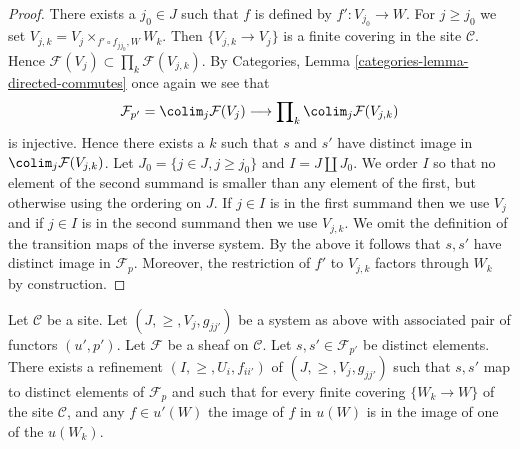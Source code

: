 \begin{proof}
There exists a $j_0 \in J$ such that $f$ is defined by $f' : V_{j_0} \to W$.
For $j \geq j_0$ we set $V_{j, k} = V_j \times_{f'\circ f_{j j_0}, W} W_k$.
Then $\{V_{j, k} \to V_j\}$ is a finite covering in the site
$\mathcal{C}$. Hence
$\mathcal{F}(V_j) \subset \prod_k \mathcal{F}(V_{j, k})$.
By Categories, Lemma \ref{categories-lemma-directed-commutes}
once again we see that
$$
\mathcal{F}_{p'} =
\colim_j \mathcal{F}(V_j)
\longrightarrow
\prod\nolimits_k \colim_j \mathcal{F}(V_{j, k})
$$
is injective. Hence there exists a $k$ such that $s$ and $s'$
have distinct image in $\colim_j \mathcal{F}(V_{j, k})$.
Let $J_0 = \{j \in J, j \geq j_0\}$ and $I = J \amalg J_0$.
We order $I$ so that no element of the second summand
is smaller than any element of the first, but otherwise
using the ordering on $J$. If $j \in I$ is in the first
summand then we use $V_j$ and if $j \in I$ is in the second
summand then we use $V_{j, k}$. We omit the definition
of the transition maps of the inverse system. By the above
it follows that $s, s'$ have distinct image in $\mathcal{F}_p$.
Moreover, the restriction of $f'$ to $V_{j, k}$ factors
through $W_k$ by construction.
\end{proof}

\begin{lemma}
\label{lemma-refine-all-at-once}
Let $\mathcal{C}$ be a site.
Let $(J, \geq, V_j, g_{jj'})$ be a system as above with associated
pair of functors $(u', p')$.
Let $\mathcal{F}$ be a sheaf on $\mathcal{C}$.
Let $s, s' \in \mathcal{F}_{p'}$ be distinct elements.
There exists a refinement $(I, \geq, U_i, f_{ii'})$
of $(J, \geq, V_j, g_{jj'})$ such that $s, s'$ map
to distinct elements of $\mathcal{F}_p$ and such that
for every finite covering $\{W_k \to W\}$ of the site
$\mathcal{C}$, and any $f \in u'(W)$ the image of $f$ in $u(W)$
is in the image of one of the $u(W_k)$.
\end{lemma}

